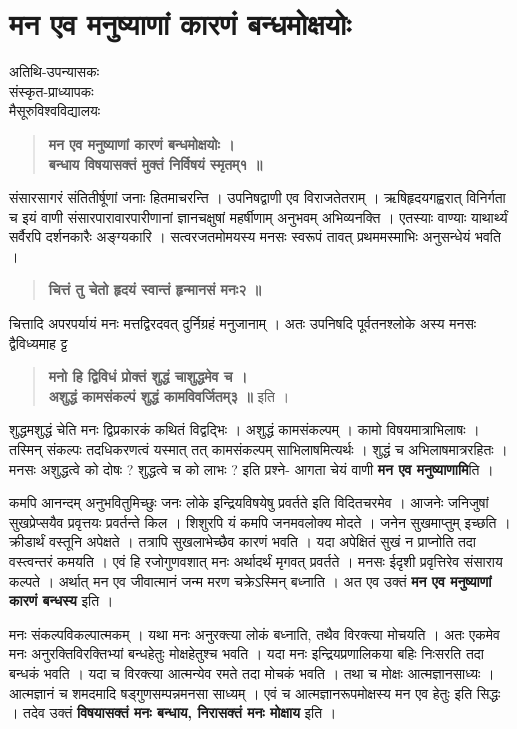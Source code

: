 {\fontsize{15}{17}\selectfont
\chapter{मन एव मनुष्याणां कारणं बन्धमोक्षयोः }

\begin{center}
\smallskip
अतिथि-उपन्यासकः\\
संस्कृत-प्राध्यापकः\\
मैसूरुविश्वविद्यालयः
\addrule
\end{center}
\begin{verse}
\textbf{मन एव मनुष्याणां कारणं बन्धमोक्षयोः ।\\
बन्धाय विषयासक्तं मुक्तं निर्विषयं स्मृतम्१ ॥}
\end{verse}
संसारसागरं संतितीर्षूणां जनाः हितमाचरन्ति । उपनिषद्वाणी एव विराजतेतराम् । ऋषिहृदयगह्वरात् विनिर्गता च इयं वाणी संसारपारावारपारीणानां ज्ञानचक्षुषां महर्षीणाम् अनुभवम् अभिव्यनक्ति । एतस्याः वाण्याः याथार्थ्यं सर्वैरपि दर्शनकारैः अङ्ग्यकारि । सत्वरजतमोमयस्य मनसः स्वरूपं तावत् प्रथममस्माभिः अनुसन्धेयं भवति ।
\begin{verse}
\textbf{चित्तं तु चेतो हृदयं स्वान्तं हृन्मानसं मनः२ ॥}
\end{verse}
चित्तादि अपरपर्यायं मनः मत्तद्विरदवत् दुर्निग्रहं मनुजानाम् । अतः उपनिषदि पूर्वतनश्लोके अस्य मनसः द्वैविध्यमाह ट्ट 
\begin{verse}
\textbf{मनो हि द्विविधं प्रोक्तं शुद्धं चाशुद्धमेव च ।\\
अशुद्धं कामसंकल्पं शुद्धं कामविवर्जितम्३ ॥} इति ।
\end{verse}
शुद्धमशुद्धं चेति मनः द्विप्रकारकं कथितं विद्वद्भिः । अशुद्धं कामसंकल्पम् । कामो विषयमात्राभिलाषः । तस्मिन् संकल्पः तदधिकरणत्वं यस्मात् तत् कामसंकल्पम् साभिलाषमित्यर्थः । शुद्धं च अभिलाषमात्ररहितः । मनसः अशुद्धत्वे को दोषः ? शुद्धत्वे च को लाभः ? इति प्रश्ने- आगता चेयं वाणी \textbf{मन एव मनुष्याणामि}ति ।   

कमपि आनन्दम् अनुभवितुमिच्छुः जनः लोके इन्द्रियविषयेषु प्रवर्तते इति विदितचरमेव । आजनेः जनिजुषां सुखप्रेप्सयैव प्रवृत्तयः प्रवर्तन्ते किल । शिशुरपि यं कमपि जनमवलोक्य मोदते । जनेन सुखमाप्तुम् इच्छति । क्रीडार्थं वस्तूनि अपेक्षते । तत्रापि सुखलाभेच्छैव कारणं भवति । यदा अपेक्षितं सुखं न प्राप्नोति तदा वस्त्वन्तरं कमयति । एवं हि रजोगुणवशात् मनः अर्थादर्थं मृगवत् प्रवर्तते । मनसः ईदृशी प्रवृत्तिरेव संसाराय कल्पते । अर्थात् मन एव जीवात्मानं जन्म मरण चक्रेऽस्मिन् बध्नाति । अत एव उक्तं \textbf{मन एव मनुष्याणां कारणं बन्धस्य} इति । 

मनः संकल्पविकल्पात्मकम् । यथा मनः अनुरक्त्या लोकं बध्नाति, तथैव विरक्त्या मोचयति । अतः एकमेव मनः अनुरक्तिविरक्तिभ्यां बन्धहेतुः मोक्षहेतुश्च भवति । यदा मनः इन्द्रियप्रणालिकया बहिः निःसरति तदा बन्धकं भवति । यदा च विरक्त्या आत्मन्येव रमते तदा मोचकं भवति । तथा च मोक्षः आत्मज्ञानसाध्यः । आत्मज्ञानं च शमदमादि षड्गुणसम्पन्नमनसा साध्यम् । एवं च आत्मज्ञानरूपमोक्षस्य मन एव हेतुः इति सिद्धः । तदेव उक्तं \textbf{विषयासक्तं मनः बन्धाय, निरासक्तं मनः मोक्षाय} इति ।

}
